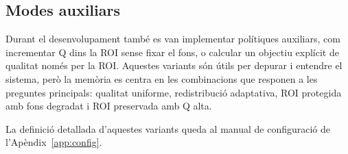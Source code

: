 \subsection{Modes auxiliars}\label{sec:auxiliary_modes}

Durant el desenvolupament també es van implementar polítiques auxiliars, com
incrementar Q dins la ROI sense fixar el fons, o calcular un objectiu explícit
de qualitat només per la ROI. Aquestes variants són útils per depurar i entendre
el sistema, però la memòria es centra en les combinacions que responen a les
preguntes principals: qualitat uniforme, redistribució adaptativa, ROI protegida
amb fons degradat i ROI preservada amb Q alta.

La definició detallada d'aquestes variants queda al
manual de configuració de l'Apèndix~\ref{app:config}.
